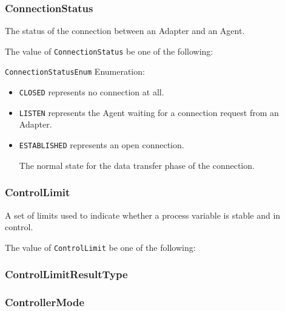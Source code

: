 \subsubsection{ConnectionStatus}
\label{sec:ConnectionStatus}



The status of the connection between an \gls{Adapter} and an \gls{Agent}.


The value of \texttt{ConnectionStatus} \MUST be one of the following: 


\texttt{ConnectionStatusEnum} Enumeration:

\begin{itemize}
\item \texttt{CLOSED} \newline represents no connection at all. 
\item \texttt{LISTEN} \newline represents the \gls{Agent} waiting for a connection request from an \gls{Adapter}. 
\item \texttt{ESTABLISHED} \newline represents an open connection.

The normal state for the data transfer phase of the connection. 
\end{itemize}

\FloatBarrier

\subsubsection{ControlLimit}
\label{sec:ControlLimit}



A set of limits used to indicate whether a process variable is stable and in control.


The value of \texttt{ControlLimit} \MUST be one of the following: 

\FloatBarrier

\subsubsection{ControlLimitResultType}
\label{sec:ControlLimitResultType}






\subsubsection{ControllerMode}
\label{sec:ControllerMode}



